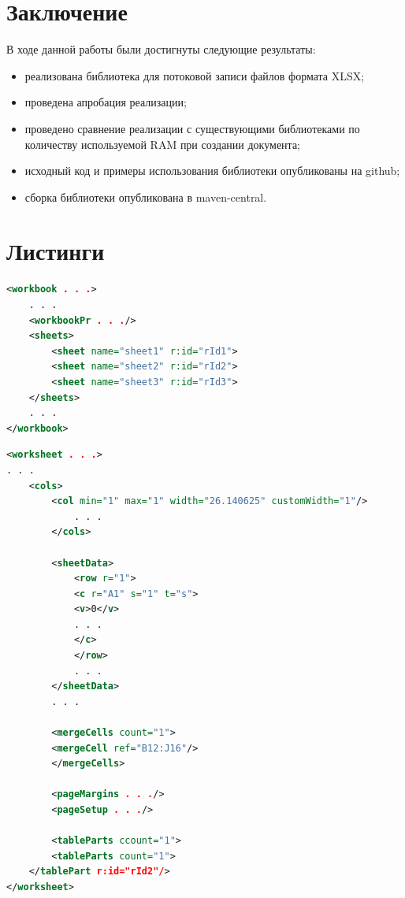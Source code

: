 \documentclass[14pt]{matmex-diploma}
\begin{document}
\section*{Заключение}
В ходе данной работы были достигнуты следующие результаты:
\begin{itemize}
    \item реализована библиотека для потоковой записи файлов формата XLSX;
    \item проведена апробация реализации;
    \item проведено сравнение реализации с существующими библиотеками по количеству используемой RAM при создании документа;
    \item исходный код и примеры использования библиотеки опубликованы на github;
    \item сборка библиотеки опубликована в maven-central.
\end{itemize}

\section*{Листинги}
\begin{lstlisting}[language=XML, style=basic, caption={Пример файла workbook.xml},captionpos=b, label=list1]
<workbook . . .>
    . . .
    <workbookPr . . ./>
    <sheets>
        <sheet name="sheet1" r:id="rId1">
        <sheet name="sheet2" r:id="rId2">
        <sheet name="sheet3" r:id="rId3">
    </sheets>
    . . .
</workbook>
\end{lstlisting}

\begin{lstlisting}[language=XML, style=basic, caption={Пример файла worksheet.xml},captionpos=b, label=list2]
<worksheet . . .>
. . .
    <cols>
        <col min="1" max="1" width="26.140625" customWidth="1"/>
            . . .
        </cols>
        
        <sheetData>
            <row r="1">
            <c r="A1" s="1" t="s">
            <v>0</v>
            . . .
            </c>
            </row>
            . . .
        </sheetData>
        . . .
        
        <mergeCells count="1">
        <mergeCell ref="B12:J16"/>
        </mergeCells>
        
        <pageMargins . . ./>
        <pageSetup . . ./>
        
        <tableParts ccount="1">
        <tableParts count="1">
    </tablePart r:id="rId2"/>
</worksheet>
\end{lstlisting}
\end{document}
